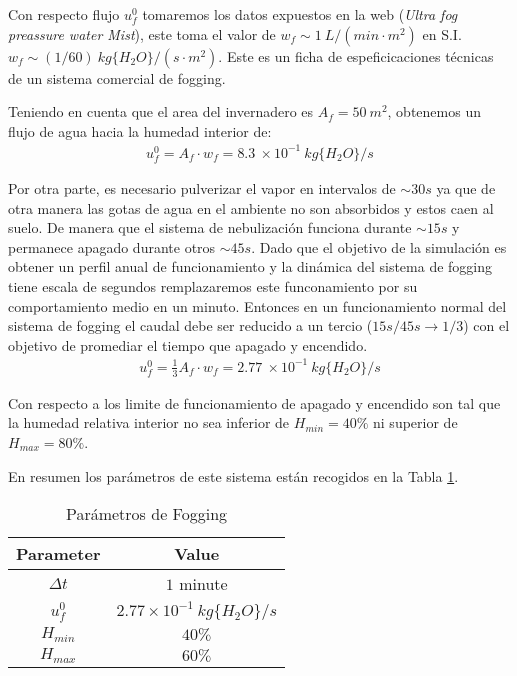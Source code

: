 \documentclass{article}
\begin{document}
Con respecto flujo $u_{f}^{0}$ tomaremos los datos expuestos en la web \cite{WATERMIS30:online}(\emph{Ultra fog preassure water Mist}), este toma el valor de  $w_f \sim  1 \ L/(min\cdot m^2)$ en S.I. $w_f \sim 
(1/60)  \ kg\{H_2O\}/(s\cdot m^2)$. Este es un ficha de espeficicaciones técnicas de un sistema comercial de fogging. 
%
\newline

Teniendo en cuenta que el area del invernadero es $A_f = 50 \ m^2$, obtenemos un flujo de agua hacia la humedad interior de:
%
\begin{gather}
    u_f^0=A_f \cdot w_f = 8.3 \ \times 10^{-1}\ kg\{H_2O\}/s
\end{gather} 

Por otra parte, es necesario pulverizar el vapor en intervalos de $\sim 30s$ ya que de otra manera las gotas de agua en el ambiente no son absorbidos y estos caen al suelo. 
%
De manera que el sistema de nebulización funciona durante $\sim 15s$ y permanece apagado durante otros $\sim 45s$. Dado que el objetivo de la simulación es obtener un perfil anual de funcionamiento y la dinámica del sistema de fogging tiene escala de segundos remplazaremos este funconamiento por su comportamiento medio en un minuto. Entonces en un funcionamiento normal del sistema de fogging el caudal debe ser reducido a un tercio ($15s/45s \to 1/3$) con el objetivo de promediar el tiempo que  apagado y encendido.
\begin{gather}
    u_f^0= \frac{1}{3}A_f \cdot w_f = 2.77 \ \times 10^{-1}\ kg\{H_2O\}/s
\end{gather} 

Con respecto a los limite de funcionamiento de apagado y encendido son tal que la humedad relativa interior no sea inferior de $H_{min}=40\%$ ni superior de $H_{max}=80\%$.
\newline 


En resumen los parámetros de este sistema están recogidos en la Tabla \ref{table:fog_params}.
\newline

\begin{table}[ht!]
    \centering
    \begin{tabular}{|c|c|}
        \hline 
        Parameter & Value \\ \hline \hline
        $\Delta t$ & $1$ minute \\ 
        $u_{f}^{0}$ & $2.77 \times 10^{-1} \ kg\{H_2O\}/s$ \\
        $H_{min}$ & $40\%$ \\
        $H_{max}$ & $60\%$ \\
        \hline 
    \end{tabular}
    \caption{Parámetros de Fogging}\label{table:fog_params}
\end{table}
\end{document}

